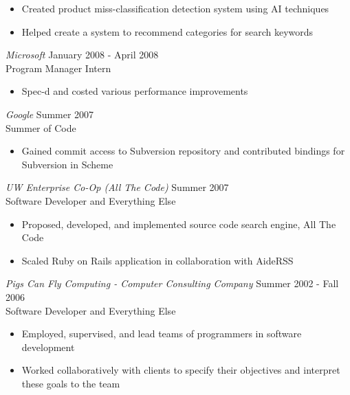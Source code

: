 \documentclass[10pt,line,margin=0.1]{newsres}
\begin{document}
\begin{resume}
\begin{itemize}
        \item Created product miss-classification detection system using AI techniques
        \item Helped create a system to recommend categories for search keywords
        \end{itemize} 
        {\sl Microsoft} \hfill        January 2008 - April 2008 \\
        Program Manager Intern
        \begin{itemize}
        \item Spec-d and costed various performance improvements
        \end{itemize} 
        {\sl Google} \hfill        Summer 2007 \\
        Summer of Code
        \begin{itemize}
        \item Gained commit access to Subversion repository and contributed bindings for Subversion in Scheme
        \end{itemize} 
        {\sl UW Enterprise Co-Op (All The Code)} \hfill Summer 2007 \\
        Software Developer and Everything Else
        \begin{itemize}  \itemsep -2pt %
        \item{Proposed, developed, and implemented source code search engine, All The Code}
        \item{Scaled Ruby on Rails application in collaboration with AideRSS}
        \end{itemize}
        {\sl Pigs Can Fly Computing - Computer Consulting Company} \hfill Summer 2002 - Fall 2006 \\
        Software Developer and Everything Else
        \begin{itemize}  \itemsep -2pt %
        \item{Employed, supervised, and lead teams of programmers in software development}
        \item{Worked collaboratively with clients to specify their objectives and interpret these goals to the team}
        \end{itemize}


\end{resume}
\end{document}
